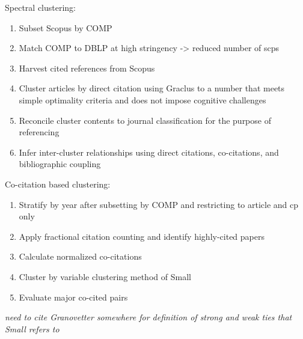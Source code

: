 \noindent
 Spectral clustering:
\begin{enumerate}
\item Subset Scopus by COMP
\item Match COMP to DBLP at high stringency -> reduced number of scps
 \item Harvest cited references  from Scopus
 \item Cluster articles by direct citation using Graclus to a number that meets simple optimality criteria and does not impose cognitive challenges
 \item Reconcile cluster contents to journal classification for the purpose of referencing
 \item Infer inter-cluster relationships using direct citations, co-citations, and bibliographic coupling
\end{enumerate}

\noindent
Co-citation based clustering:
\begin{enumerate}
\item Stratify by year after subsetting by COMP and restricting to article and cp only
\item Apply fractional citation counting and identify highly-cited papers
\item Calculate normalized co-citations
\item Cluster by variable clustering method of Small
\item Evaluate major co-cited pairs
\end{enumerate}


\emph{need to cite Granovetter somewhere for definition of strong and weak ties that Small refers to}




%
%



